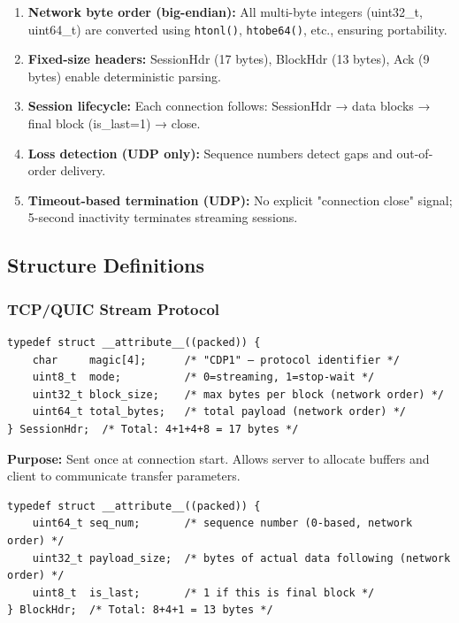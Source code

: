 \documentclass[12pt,a4paper]{article}
\begin{document}
\begin{tcolorbox}[colback=gray!5,colframe=keycolor,title=Protocol Design Principles]
\begin{enumerate}
  \item \textbf{Network byte order (big-endian):} All multi-byte integers (uint32\_t, uint64\_t) are converted using \texttt{htonl()}, \texttt{htobe64()}, etc., ensuring portability.
  \item \textbf{Fixed-size headers:} SessionHdr (17 bytes), BlockHdr (13 bytes), Ack (9 bytes) enable deterministic parsing.
  \item \textbf{Session lifecycle:} Each connection follows: SessionHdr → data blocks → final block (is\_last=1) → close.
  \item \textbf{Loss detection (UDP only):} Sequence numbers detect gaps and out-of-order delivery.
  \item \textbf{Timeout-based termination (UDP):} No explicit "connection close" signal; 5-second inactivity terminates streaming sessions.
\end{enumerate}
\end{tcolorbox}

\subsection{Structure Definitions}

\subsubsection{TCP/QUIC Stream Protocol}

\begin{lstlisting}[caption=SessionHdr Structure (17 bytes),label=lst:sessionhdr]
typedef struct __attribute__((packed)) {
    char     magic[4];      /* "CDP1" – protocol identifier */
    uint8_t  mode;          /* 0=streaming, 1=stop-wait */
    uint32_t block_size;    /* max bytes per block (network order) */
    uint64_t total_bytes;   /* total payload (network order) */
} SessionHdr;  /* Total: 4+1+4+8 = 17 bytes */
\end{lstlisting}

\textbf{Purpose:} Sent once at connection start. Allows server to allocate buffers and client to communicate transfer parameters.

\vspace{0.3cm}

\begin{lstlisting}[caption=BlockHdr Structure (13 bytes),label=lst:blockhdr]
typedef struct __attribute__((packed)) {
    uint64_t seq_num;       /* sequence number (0-based, network order) */
    uint32_t payload_size;  /* bytes of actual data following (network order) */
    uint8_t  is_last;       /* 1 if this is final block */
} BlockHdr;  /* Total: 8+4+1 = 13 bytes */
\end{lstlisting}
\end{document}
